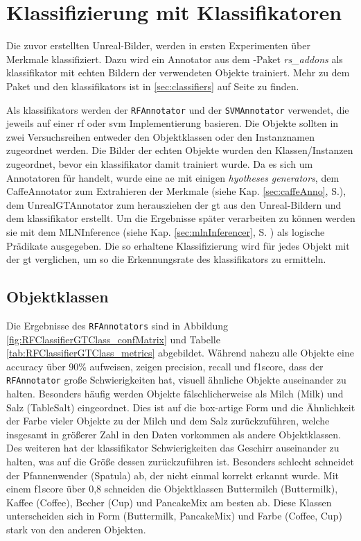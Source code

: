 \section{Klassifizierung mit Klassifikatoren}
\label{sec:classificationExperiment}
Die zuvor erstellten Unreal-Bilder, werden in ersten Experimenten über Merkmale klassifiziert. Dazu wird ein Annotator aus dem \robosherlock-Paket \textit{rs\_addons} als \gls{klassifikator} mit echten Bildern der verwendeten Objekte trainiert. Mehr zu dem Paket und den \glspl{klassifikator} ist in \ref{sec:classifiers} auf Seite \pageref{sec:classifiers} zu finden. \par

Als \glspl{klassifikator} werden der \texttt{RFAnnotator} und der \texttt{SVMAnnotator} verwendet, die jeweils auf einer \gls{rf} oder \gls{svm} Implementierung basieren. Die Objekte sollten in zwei Versuchsreihen entweder den Objektklassen oder den Instanznamen zugeordnet werden. Die Bilder der echten Objekte wurden den Klassen/Instanzen zugeordnet, bevor ein \gls{klassifikator} damit trainiert wurde. Da es sich um Annotatoren für \robosherlock handelt, wurde eine \gls{ae} mit einigen \textit{hyotheses generators}, dem CaffeAnnotator zum Extrahieren der Merkmale (siehe Kap. \ref{sec:caffeAnno}, S.\pageref{sec:caffeAnno}), dem UnrealGTAnnotator zum herausziehen der \gls{gt} aus den Unreal-Bildern und dem \gls{klassifikator} erstellt. Um die Ergebnisse später verarbeiten zu können werden sie mit dem MLNInference (siehe Kap. \ref{sec:mlnInferencer}, S. \pageref{sec:mlnInferencer}) als logische Prädikate ausgegeben. Die so erhaltene Klassifizierung wird für jedes Objekt mit der \gls{gt} verglichen, um so die Erkennungsrate des \gls{klassifikator}s zu ermitteln.


\subsection{Objektklassen}
Die Ergebnisse des \texttt{RFAnnotators} sind in Abbildung \ref{fig:RFClassifierGTClass_confMatrix} und Tabelle \ref{tab:RFClassifierGTClass_metrics} abgebildet. Während nahezu alle Objekte eine \gls{accuracy} über 90\% aufweisen, zeigen \gls{precision}, \gls{recall} und \gls{f1score}, dass der \texttt{RFAnnotator} große Schwierigkeiten hat, visuell ähnliche Objekte auseinander zu halten. Besonders häufig werden Objekte fälschlicherweise als Milch (Milk) und Salz (TableSalt)  eingeordnet. Dies ist auf die box-artige Form und die Ähnlichkeit der Farbe vieler Objekte zu der Milch und dem Salz zurückzuführen, welche insgesamt in größerer Zahl in den Daten vorkommen als andere Objektklassen. Des weiteren hat der \gls{klassifikator} Schwierigkeiten das Geschirr auseinander zu halten, was auf die Größe dessen zurückzuführen ist. Besonders schlecht schneidet der Pfannenwender (Spatula) ab, der nicht einmal korrekt erkannt wurde. Mit einem \gls{f1score} über 0,8 schneiden die Objektklassen Buttermilch (Buttermilk), Kaffee (Coffee), Becher (Cup) und PancakeMix am besten ab. Diese Klassen unterscheiden sich in Form (Buttermilk, PancakeMix) und Farbe (Coffee, Cup) stark von den anderen Objekten.  

